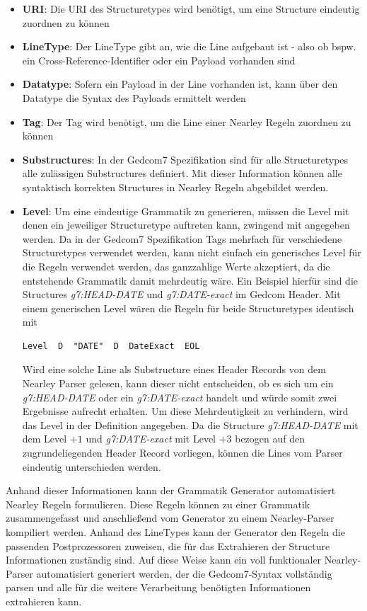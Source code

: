 \begin{itemize}
	\item \textbf{URI}: Die URI des Structuretypes wird benötigt, um eine Structure eindeutig zuordnen zu können 
	\item \textbf{LineType}: Der LineType gibt an, wie die Line aufgebaut ist - also ob bspw. ein Cross-Reference-Identifier oder ein Payload vorhanden sind
	\item \textbf{Datatype}: Sofern ein Payload in der Line vorhanden ist, kann über den Datatype die Syntax des Payloads ermittelt werden
	\item \textbf{Tag}: Der Tag wird benötigt, um die Line einer Nearley Regeln zuordnen zu können
	\item \textbf{Substructures}: In der Gedcom7 Spezifikation sind für alle Structuretypes alle zulässigen Substructures definiert. Mit dieser Information können alle syntaktisch korrekten Structures in Nearley Regeln abgebildet werden.
	\item \textbf{Level}: Um eine eindeutige Grammatik zu generieren, müssen die Level mit denen ein jeweiliger Structuretype auftreten kann, zwingend mit angegeben werden. Da in der Gedcom7 Spezifikation Tags mehrfach für verschiedene Structuretypes verwendet werden, kann nicht einfach ein generisches Level für die Regeln verwendet werden, das ganzzahlige Werte akzeptiert, da die entstehende Grammatik damit mehrdeutig wäre. Ein Beispiel hierfür sind die Structures \textit{g7:HEAD-DATE} und \textit{g7:DATE-exact} im Gedcom Header. Mit einem generischen Level wären die Regeln für beide Structuretypes identisch mit 
	\begin{lstlisting}[frame=none]
	  Level  D  "DATE"  D  DateExact  EOL
	\end{lstlisting}
	Wird eine solche Line als Substructure eines Header Records von dem Nearley Parser gelesen, kann dieser nicht entscheiden, ob es sich um ein \textit{g7:HEAD-DATE} oder ein \textit{g7:DATE-exact} handelt und würde somit zwei Ergebnisse aufrecht erhalten. Um diese Mehrdeutigkeit zu verhindern, wird das Level in der Definition angegeben. Da die Structure \textit{g7:HEAD-DATE} mit dem Level $+1$ und \textit{g7:DATE-exact} mit Level $+3$ bezogen auf den zugrundeliegenden Header Record vorliegen, können die Lines vom Parser eindeutig unterschieden werden.
\end{itemize}
\newpage
Anhand dieser Informationen kann der Grammatik Generator automatisiert Nearley Regeln formulieren. Diese Regeln können zu einer Grammatik zusammengefasst und anschließend vom Generator zu einem Nearley-Parser kompiliert werden. Anhand des LineTypes kann der Generator den Regeln die passenden Postprozessoren zuweisen, die für das Extrahieren der Structure Informationen zuständig sind. Auf diese Weise kann ein voll funktionaler Nearley-Parser automatisiert generiert werden, der die Gedcom7-Syntax vollständig parsen und alle für die weitere Verarbeitung benötigten Informationen extrahieren kann. 


